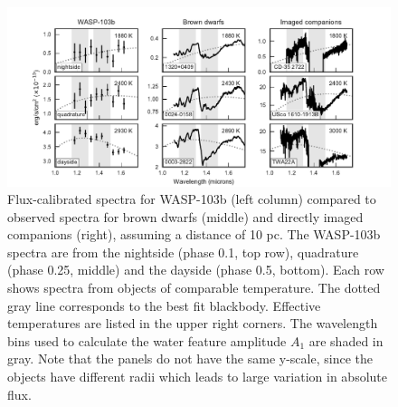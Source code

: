 \documentclass[twocolumn, trackchanges]{aastex61}
\begin{document}
\begin{figure}
\includegraphics[width = 1.0\textwidth]{fig17.pdf}
\caption{Flux-calibrated spectra for WASP-103b (left column) compared to
observed spectra for brown dwarfs (middle) and directly imaged companions
(right), assuming a distance of 10 pc. The WASP-103b spectra are from the
nightside (phase 0.1, top row), quadrature (phase 0.25, middle) and the dayside
(phase 0.5, bottom). Each row shows spectra from objects of comparable
temperature. The dotted gray line corresponds to the best fit blackbody.
Effective temperatures are listed in the upper right corners. The wavelength
bins used to calculate the water feature amplitude $A_1$ are shaded in gray.
Note that the panels do not have the same y-scale, since the objects have
different radii which leads to large variation in absolute flux.}
\label{fig:planetstarcomparison}
\end{figure}
\end{document}
